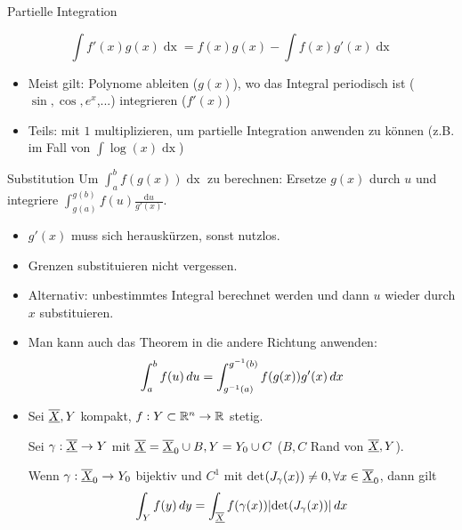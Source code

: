 \begin{mainbox}{Partielle Integration}
	
	$$\int f'(x) g(x) \mathop{dx} = f(x)g(x) - \int f(x) g'(x) \mathop{dx}$$
\end{mainbox}
\begin{itemize}
	\item Meist gilt: Polynome ableiten ($g(x)$), wo das Integral periodisch ist ($\sin, \cos, e^x$,...) integrieren ($f'(x)$)
	\item Teils: mit $1$ multiplizieren, um partielle Integration anwenden zu können (z.B. im Fall von $\int \log(x) \mathop{dx}$)
\end{itemize}
\begin{mainbox}{Substitution}
	Um $\int_a^b f(g(x)) \mathop{dx}$ zu berechnen: Ersetze $g(x)$ durch $u$ und integriere $\int_{g(a)}^{g(b)} f(u) \frac{\text{d}u}{g'(x)}$.
\end{mainbox}
\begin{itemize}
	\item $g'(x)$ muss sich herauskürzen, sonst nutzlos.
	\item Grenzen substituieren nicht vergessen.
	\item Alternativ: unbestimmtes Integral berechnet werden und dann $u$ wieder durch $x$ substituieren.
	\item Man kann auch das Theorem in die andere Richtung anwenden: \[\int_a^b f(u) \mathop{du} = \int_{g^{-1}(a)}^{g^{-1}(b)}f(g(x))g'(x) \mathop{dx}\]
	\item Sei $\underline{\overline{X}}, Y$ kompakt, $f: Y \subset \mathbb{R}^n \to \mathbb{R}$ stetig. 
	
	Sei $\gamma: \underline{\overline{X}} \to Y$ mit $\underline{\overline{X}} = \underline{\overline{X}}_0 \cup B, Y = Y_0 \cup C$ ($B, C$ Rand von $\underline{\overline{X}}, Y$). 
	
	Wenn $\gamma: \underline{\overline{X}}_0 \to Y_0$ bijektiv und $C^1$ mit det$(J_\gamma(x)) \neq 0, \forall x \in \underline{\overline{X}}_0$, dann gilt 
	\[\int_Y f(y)\mathop{dy} = \int_{\underline{\overline{X}}} f(\gamma(x))|\text{det}(J_\gamma(x))|\mathop{dx}\]
\end{itemize}

